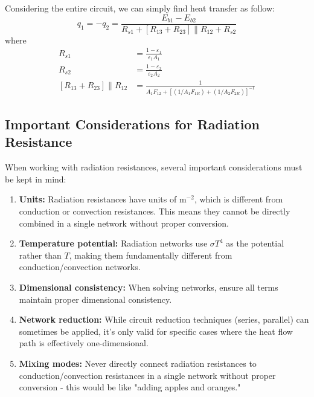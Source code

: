 Considering the entire circuit, we can simply find heat transfer as follow:
\[
        q_1 = - q_2 = \frac{E_{b1}-E_{b2}}{R_{s1} + [R_{13}+R_{23}]\parallel R_{12} + R_{s2}}
\]
where
\[
    \begin{aligned}
        R_{s1} &= \frac{1-\varepsilon_1}{\varepsilon_1 A_1}
        \\[1em]
        R_{s2} &= \frac{1-\varepsilon_2}{\varepsilon_2 A_2}
        \\[1em]
        [R_{13}+R_{23}]\parallel  R_{12} &= \frac{1}{A_1 F_{12}+\left[\left(1 / A_1 F_{1 R}\right)+\left(1 / A_2 F_{2 R}\right)\right]^{-1}}
    \end{aligned}
\]

\subsection*{Important Considerations for Radiation Resistance}

When working with radiation resistances, several important considerations must be kept in mind:

\begin{enumerate}
    \item \textbf{Units:} Radiation resistances have units of $\text{m}^{-2}$, which is different from conduction or convection resistances. This means they cannot be directly combined in a single network without proper conversion.
    
    \item \textbf{Temperature potential:} Radiation networks use $\sigma T^4$ as the potential rather than $T$, making them fundamentally different from conduction/convection networks.
    
    \item \textbf{Dimensional consistency:} When solving networks, ensure all terms maintain proper dimensional consistency.
    
    \item \textbf{Network reduction:} While circuit reduction techniques (series, parallel) can sometimes be applied, it's only valid for specific cases where the heat flow path is effectively one-dimensional.
    
    \item \textbf{Mixing modes:} Never directly connect radiation resistances to conduction/convection resistances in a single network without proper conversion - this would be like "adding apples and oranges."
\end{enumerate}

